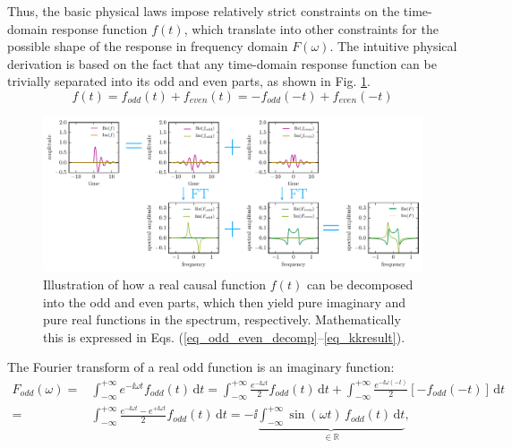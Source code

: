 Thus, the basic physical laws impose relatively strict constraints on the time-domain response function $f(t)$, which translate into other constraints for the possible shape of the response in frequency domain $F(\omega)$. The intuitive physical derivation is based on the fact that any time-domain response function can be trivially separated into its odd and even parts, as shown in Fig. \ref{fg_kk}. 
\begin{equation}f(t) = f_{odd}(t) + f_{even}(t) = -f_{odd}(-t) + f_{even}(-t) \label{eq_odd_even_decomp}\end{equation}
\begin{figure}[t] \caption{Illustration of how a real causal function $f(t)$ can be decomposed into the odd and even parts, which then yield pure imaginary and pure real functions in the spectrum, respectively. Mathematically this is expressed in Eqs. (\ref{eq_odd_even_decomp}--\ref{eq_kkresult}).} \label{fg_kk} \centering 
	\includegraphics[width=17.5cm]{img/Kramers_Kronig_plot/kk.pdf}
\end{figure}
The Fourier transform of a real odd function is an imaginary function:
\begin{equation} 
\begin{split} 
F_{odd}(\omega)=& \int_{-\infty}^{+\infty} e^{-\ii \omega t} f_{odd}(t) \,\mbox{d}t = 
		 \int_{-\infty}^{+\infty} \frac{e^{-\ii \omega   t }}{2} f_{odd}(t) \,\mbox{d}t 
		   +  \int_{-\infty}^{+\infty} \frac{e^{-\ii \omega (-t)}}{2} [-f_{odd}(-t)] \,\mbox{d}t  \\
		 =&   \int_{-\infty}^{+\infty} \frac{e^{-\ii \omega t}-e^{+\ii \omega t}}{2} f_{odd}(t) \,\mbox{d}t 
		 = -\ii \underbrace{\int_{-\infty}^{+\infty} \sin(\omega t) \, f_{odd}(t) \,\mbox{d}t}_{\mbox{$\in \mathbb{R}$}},
\end{split} 
\label{eq_kkF}\end{equation}
